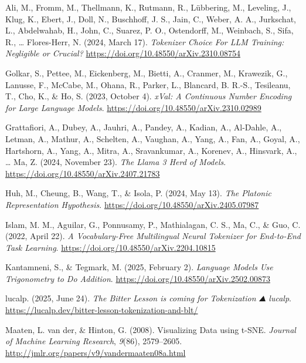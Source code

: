 \documentclass[
  a4paper, twoside, 10pt, titlepage]{book}
\newlength{\cslhangindent}
\newenvironment{CSLReferences}[2] %
 {\begin{list}{}{%
  \setlength{\itemindent}{0pt}
  \setlength{\leftmargin}{0pt}
  \setlength{\parsep}{0pt}
  \ifodd #1
   \setlength{\leftmargin}{\cslhangindent}
   \setlength{\itemindent}{-1\cslhangindent}
  \fi
  \setlength{\itemsep}{#2\baselineskip}}}
 {\end{list}}
\begin{document}
\label{refs}
\begin{CSLReferences}{1}{0}
Ali, M., Fromm, M., Thellmann, K., Rutmann, R., Lübbering, M., Leveling,
J., Klug, K., Ebert, J., Doll, N., Buschhoff, J. S., Jain, C., Weber, A.
A., Jurkschat, L., Abdelwahab, H., John, C., Suarez, P. O., Ostendorff,
M., Weinbach, S., Sifa, R., \ldots{} Flores-Herr, N. (2024, March 17).
\emph{Tokenizer {Choice For LLM Training}: {Negligible} or {Crucial}?}
\url{https://doi.org/10.48550/arXiv.2310.08754}

Golkar, S., Pettee, M., Eickenberg, M., Bietti, A., Cranmer, M.,
Krawezik, G., Lanusse, F., McCabe, M., Ohana, R., Parker, L., Blancard,
B. R.-S., Tesileanu, T., Cho, K., \& Ho, S. (2023, October 4).
\emph{{xVal}: {A Continuous Number Encoding} for {Large Language
Models}}. \url{https://doi.org/10.48550/arXiv.2310.02989}

Grattafiori, A., Dubey, A., Jauhri, A., Pandey, A., Kadian, A.,
Al-Dahle, A., Letman, A., Mathur, A., Schelten, A., Vaughan, A., Yang,
A., Fan, A., Goyal, A., Hartshorn, A., Yang, A., Mitra, A., Sravankumar,
A., Korenev, A., Hinsvark, A., \ldots{} Ma, Z. (2024, November 23).
\emph{The {Llama} 3 {Herd} of {Models}}.
\url{https://doi.org/10.48550/arXiv.2407.21783}

Huh, M., Cheung, B., Wang, T., \& Isola, P. (2024, May 13). \emph{The
{Platonic Representation Hypothesis}}.
\url{https://doi.org/10.48550/arXiv.2405.07987}

Islam, M. M., Aguilar, G., Ponnusamy, P., Mathialagan, C. S., Ma, C., \&
Guo, C. (2022, April 22). \emph{A {Vocabulary-Free Multilingual Neural
Tokenizer} for {End-to-End Task Learning}}.
\url{https://doi.org/10.48550/arXiv.2204.10815}

Kantamneni, S., \& Tegmark, M. (2025, February 2). \emph{Language
{Models Use Trigonometry} to {Do Addition}}.
\url{https://doi.org/10.48550/arXiv.2502.00873}

lucalp. (2025, June 24). \emph{The {Bitter Lesson} is coming for
{Tokenization} \textbar{} ⛰️ lucalp}.
\url{https://lucalp.dev/bitter-lesson-tokenization-and-blt/}

Maaten, L. van der, \& Hinton, G. (2008). Visualizing {Data} using
t-{SNE}. \emph{Journal of Machine Learning Research}, \emph{9}(86),
2579--2605. \url{http://jmlr.org/papers/v9/vandermaaten08a.html}


\end{CSLReferences}
\end{document}
